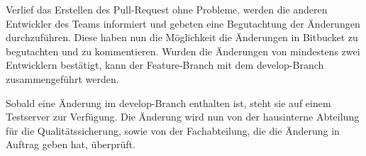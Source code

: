 Verlief das Erstellen des Pull-Request ohne Probleme, werden die anderen Entwickler des Teams informiert und gebeten eine Begutachtung der Änderungen durchzuführen. Diese haben nun die Möglichkeit die Änderungen in Bitbucket zu begutachten und zu kommentieren. Wurden die Änderungen von mindestens zwei Entwicklern bestätigt, kann der Feature-Branch mit dem develop-Branch zusammengeführt werden. 

Sobald eine Änderung im develop-Branch enthalten ist, steht sie auf einem Testserver zur Verfügung. Die Änderung wird nun von der hausinterne Abteilung für die Qualitätssicherung, sowie von der Fachabteilung, die die Änderung in Auftrag geben hat, überprüft.